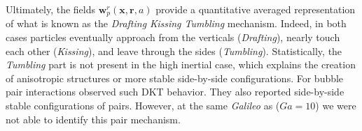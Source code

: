 Ultimately, the fields $\textbf{w}^r_p(\textbf{x},\textbf{r}, a)$ provide a quantitative averaged representation of what is known as the \textit{Drafting Kissing Tumbling} \citep{fortes1987nonlinear} mechanism. 
Indeed, in both cases particles eventually approach from the verticals (\textit{Drafting}), nearly touch each other (\textit{Kissing}), and leave through the sides (\textit{Tumbling}). 
Statistically, the \textit{Tumbling} part is not present in the high inertial case, which explains the creation of anisotropic structures or more stable side-by-side configurations. 
For bubble pair interactions \citet{zhang2021three} observed such DKT behavior.
They also reported side-by-side stable configurations of pairs. 
However, at the same \textit{Galileo} as \citet{zhang2021three} ($Ga = 10$) we were not able to identify this pair mechanism. 


